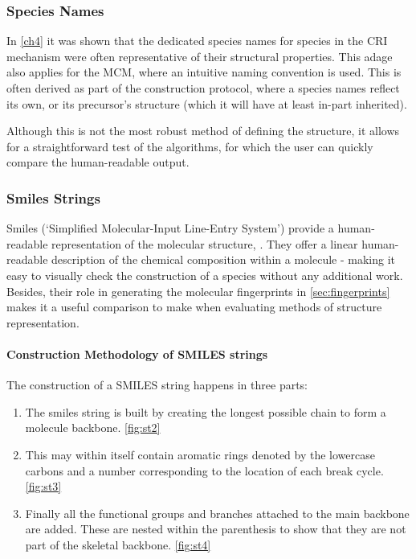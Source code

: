 \subsubsection{Species Names}
In \autoref{ch4} it was shown that the dedicated species names for species in the CRI mechanism were often representative of their structural properties. This adage also applies for the MCM, where an intuitive naming convention is used. This is often derived as part of the construction protocol, where a species names reflect its own, or its precursor's structure (which it will have at least in-part inherited).

Although this is not the most robust method of defining the structure, it allows for a straightforward test of the algorithms, for which the user can quickly compare the human-readable output.


\subsubsection{Smiles Strings}\label{sec:smiles}


 Smiles (`Simplified Molecular-Input Line-Entry System') provide a human-readable representation of the molecular structure,
 \citep{smiles}. They offer a linear human-readable description of the chemical composition within a molecule - making it easy to visually check the construction of a species without any additional work. Besides, their role in generating the molecular fingerprints in \autoref{sec:fingerprints} makes it a useful comparison to make when evaluating methods of structure representation.

\paragraph*{Construction Methodology of SMILES strings}
The construction of a SMILES string happens in three parts:

\begin{enumerate}
    \item The smiles string is built by creating the longest possible chain to form a molecule backbone.
    \autoref{fig:st2}

    \item This may within itself contain aromatic rings denoted by the lowercase carbons and a number corresponding to the location of each break cycle. \autoref{fig:st3}

    \item Finally all the functional groups and branches attached to the main backbone are added. These are nested within the parenthesis to show that they are not part of the skeletal backbone. \autoref{fig:st4}
\end{enumerate}




